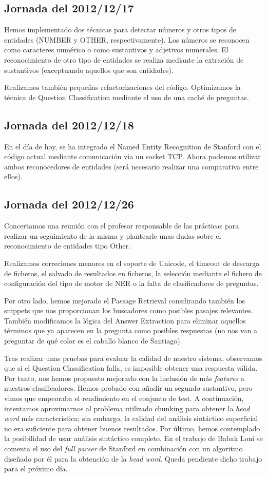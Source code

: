 \documentclass[12pt,a4paper,titlepage]{article}
\begin{document}
\subsection{Jornada del 2012/12/17}
Hemos implementado dos técnicas para detectar números y otros tipos de entidades (NUMBER y OTHER, respectivamente). Los números se reconocen como caracteres numérico o como sustantivos y adjetivos numerales. El reconocimiento de otro tipo de entidades se realiza mediante la extración de sustantivos (exceptuando aquellos que son entidades).

Realizamos también pequeñas refactorizaciones del código. Optimizamos la técnica de Question Classification mediante el uso de una caché de preguntas.

\subsection{Jornada del 2012/12/18}
En el día de hoy, se ha integrado el Named Entity Recognition de Stanford con el código actual mediante comunicación via un socket TCP. Ahora podemos utilizar ambos reconocedores de entidades (será necesario realizar una comparativa entre ellos).

\subsection{Jornada del 2012/12/26}
Concertamos una reunión con el profesor responsable de las prácticas para realizar un seguimiento de la misma y plantearle unas dudas sobre el reconocimiento de entidades tipo Other.

Realizamos correciones menores en el soporte de Unicode, el timeout de descarga de ficheros, el salvado de resultados en ficheros, la selección mediante el fichero de configuración del tipo de motor de NER o la falta de clasificadores de preguntas.

Por otro lado, hemos mejorado el Passage Retrieval consdirando también los snippets que nos proporcionan los buscadores como posibles pasajes relevantes. También modificamos la lógica del Answer Extraction para eliminar aquellos términos que ya aparecen en la pregunta como posibles respuestas (no nos van a preguntar de qué color es el caballo blanco de Santiago).

Tras realizar unas pruebas para evaluar la calidad de nuestro sistema, observamos que si el Question Classification falla, es imposible obtener una respuesta válida. Por tanto, nos hemos propuesto mejorarlo con la inclusión de más \emph{features} a nuestros clasificadores. Hemos probado con añadir un segundo sustantivo, pero vimos que empeoraba el rendimiento en el conjunto de test. A continuación, intentamos aproximarnos al problema utilizado chunking para obtener la \emph{head word} más característica; sin embargo, la calidad del análisis sintáctico superficial no era suficiente para obtener buenos resultados. Por último, hemos contemplado la posibilidad de usar análisis sintáctico completo. En el trabajo de Babak Loni \cite{tesis:qc} se comenta el uso del \emph{full parser} de Stanford en combinación con un algoritmo diseñado por él para la obtención de la \emph{head word}. Queda pendiente dicho trabajo para el próximo día.
\end{document}
